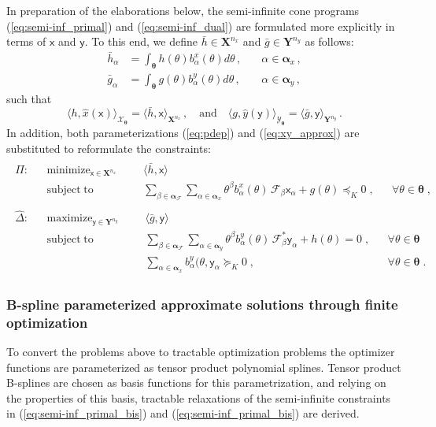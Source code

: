 \documentclass{article}
\DeclareMathOperator*{\minimize}{minimize}
\DeclareMathOperator*{\maximize}{maximize}
\DeclareMathOperator*{\subj}{subject\;to}
\newcommand{\ppar}{\theta}                          %
\newcommand{\Ppar}{{\bm{\theta}}}                   %
\newcommand{\X}{\mathbf{X}}                         %
\newcommand{\Y}{\mathbf{Y}}                         %
\newcommand{\calF}{\mathcal{F}}                     %
\newcommand{\Xm}{{\bm{\mathcal{X}}_{\Ppar}}}        %
\newcommand{\Ym}{{\bm{\mathcal{Y}}_{\Ppar}}}        %
\newcommand{\bx}{b^x}               %
\newcommand{\bxa}{\bx_\alpha}       %
\newcommand{\cx}{\textsf{x}}        %
\newcommand{\cxa}{\cx_\alpha}       %
\newcommand{\nx}{{n_x}}             %
\newcommand{\by}{b^y}               %
\newcommand{\bya}{\by_\alpha}       %
\newcommand{\cy}{\textsf{y}}        %
\newcommand{\cya}{\cy_\alpha}       %
\newcommand{\ny}{{n_y}}             %
\newcommand{\Alpha}{\bm{\alpha}}    %
\newcommand{\meanh}{\bar{h}}        %
\newcommand{\meanha}{\meanh_\alpha} %
\newcommand{\meang}{\bar{g}}        %
\newcommand{\meanga}{\meang_\alpha} %
\begin{document}
In preparation of the elaborations below, the semi-infinite cone programs (\ref{eq:semi-inf_primal}) and (\ref{eq:semi-inf_dual}) are formulated more explicitly in terms of $\cx$ and $\cy$. To this end, we define $\meanh\in\X^\nx$ and $\meang\in\Y^\ny$ as follows:
\[\begin{aligned}
   \meanha &= \int_\Ppar h(\ppar)\bxa(\ppar) d\ppar \,, & \quad\alpha\in\Alpha_x \,,\\%
   \meanga &= \int_\Ppar g(\ppar)\bya(\ppar) d\ppar \,, & \quad\alpha\in\Alpha_y \,,   %
\end{aligned}\]
such that
\[ \langle h, \hat{x}(\cx) \rangle_\Xm = \langle \meanh, \cx \rangle_{\X^\nx} \,,\quad\text{and}\quad%
   \langle g, \hat{y}(\cy) \rangle_\Ym = \langle \meang, \cy \rangle_{\Y^\ny} \,. %
\]
In addition, both parameterizations (\ref{eq:pdep}) and (\ref{eq:xy_approx}) are substituted to reformulate the constraints:
\begin{gather}\label{eq:semi-inf_primal_bis}
\begin{aligned}
\hat{\Pi}: && \minimize_{\cx\in\X^\nx} &&& \langle \meanh, \cx \rangle  \\%
           && \subj                    &&& \sum_{\beta\in\Alpha_\calF}\sum_{\alpha\in\Alpha_x} \ppar^\beta\bxa(\ppar)\,\calF_\beta \cxa + g(\ppar)\preceq_K 0 \;, && \forall \ppar\in\Ppar\;,%
\end{aligned}
\end{gather}
\begin{gather}\label{eq:semi-inf_dual_bis}
\begin{aligned}
\hat{\Delta}: && \maximize_{\cy\in\Y^\ny} &&& \langle \meang, \cy \rangle \\%
              && \subj                    &&& \sum_{\beta\in\Alpha_\calF}\sum_{\alpha\in\Alpha_y} \ppar^\beta\bya(\ppar)\,\calF_\beta^* \cya + h(\ppar)= 0 \;, && \forall \ppar \in\Ppar\\%
              &&                          &&& \sum_{\alpha\in\Alpha_x} \bya(\ppar,\cya \succeq_K 0                  \;, && \forall \ppar \in\Ppar\;.%
\end{aligned}
\end{gather}


\subsubsection{B-spline parameterized approximate solutions through finite optimization}%

To convert the problems above to tractable optimization problems the optimizer functions are parameterized as tensor product polynomial splines. Tensor product B-splines are chosen as basis functions for this parametrization, and relying on the properties of this basis, tractable relaxations of the semi-infinite constraints in (\ref{eq:semi-inf_primal_bis}) and (\ref{eq:semi-inf_primal_bis}) are derived.
\end{document}
